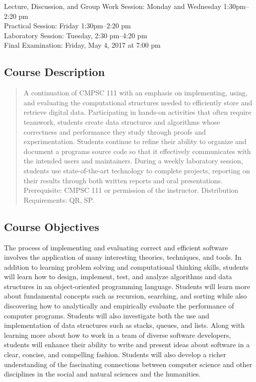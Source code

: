 \documentclass[11pt]{article}
\begin{document}
Lecture, Discussion, and Group Work Session: Monday and Wednesday 1:30pm--2:20 pm \\
Practical Session: Friday 1:30pm--2:20 pm \\
Laboratory Session: Tuesday, 2:30 pm--4:20 pm \\
Final Examination: Friday, May 4, 2017 at 7:00 pm

\subsection*{Course Description}

\begin{quote}

A continuation of CMPSC 111 with an emphasis on implementing, using, and
evaluating the computational structures needed to efficiently store and
retrieve digital data. Participating in hands-on activities that often require
teamwork, students create data structures and algorithms whose correctness and
performance they study through proofs and experimentation. Students continue to
refine their ability to organize and document a programs source code so that it
effectively communicates with the intended users and maintainers. During a
weekly laboratory session, students use state-of-the-art technology to complete
projects, reporting on their results through both written reports and oral
presentations. Prerequisite: CMPSC 111 or permission of the instructor.
Distribution Requirements: QR, SP.\@ \\

\end{quote}

\subsection*{Course Objectives}

The process of implementing and evaluating correct and efficient software involves the application of many interesting
theories, techniques, and tools. In addition to learning problem solving and computational thinking skills, students
will learn how to design, implement, test, and analyze algorithms and data structures in an object-oriented programming
language. Students will learn more about fundamental concepts such as recursion, searching, and sorting while also
discovering how to analytically and empirically evaluate the performance of computer programs. Students will also
investigate both the use and implementation of data structures such as stacks, queues, and lists. Along with learning
more about how to work in a team of diverse software developers, students will enhance their ability to write and
present ideas about software in a clear, concise, and compelling fashion. Students will also develop a richer
understanding of the fascinating connections between computer science and other disciplines in the social and natural
sciences and the humanities.
\end{document}
